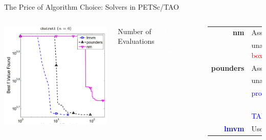 \documentclass[handout,aspectratio=54]{beamer}
\numberwithin{theorem}{section}
\begin{document}
\begin{frame}{The Price of Algorithm Choice: Solvers in PETSc/TAO}
\begin{columns}
\includegraphics[width=\textwidth]{fig/8.jpg}
\begin{center}
Number of Evaluations
\end{center}

\colorbox[rgb]{0.5,0.6,0.7}{\textcolor{white}{Increasing level of user input:}}

\begin{table}[]\scriptsize
\begin{tabular}{rl}
\textbf{\textcolor[RGB]{128,0,128}{nm}} & Assumes $\nabla_x f$\\
										& unavailable,\textcolor{red}{black box} \\
\textbf{pounders} 						& Assumes $\nabla_x f$\\
										& unavailable,\textcolor{blue}{exploits}\\
										& \textcolor{blue}{problem structure}\\
										& $\qquad\qquad$\textcolor{blue}{THIS TALK}\\
\textbf{\textcolor{blue}{lmvm}}     	& Uses available $\nabla_x f$
\end{tabular}
\end{table}

\vspace{0.8cm} 
\end{columns}

\vspace{1cm} 
\end{frame}
\end{document}
